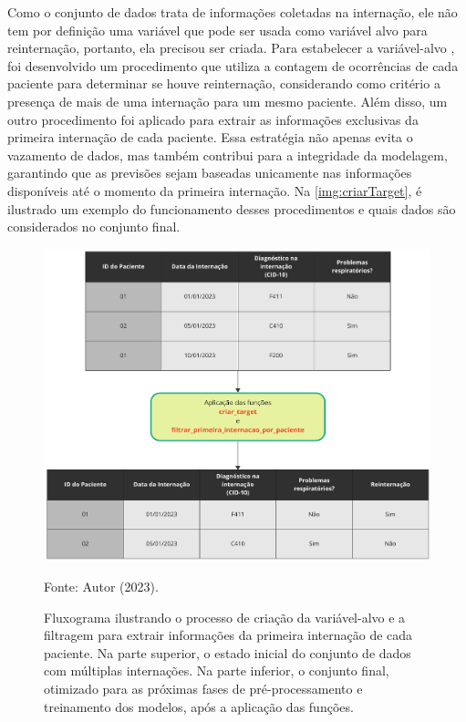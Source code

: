 Como o conjunto de dados trata de informações coletadas na internação, ele não tem por definição uma variável que pode ser usada como variável alvo para reinternação, portanto, ela precisou ser criada. Para estabelecer a variável-alvo , foi desenvolvido um procedimento que utiliza a contagem de ocorrências de cada paciente para determinar se houve reinternação, considerando como critério a presença de mais de uma internação para um mesmo paciente. Além disso, um outro procedimento foi aplicado para extrair as informações exclusivas da primeira internação de cada paciente. Essa estratégia não apenas evita o vazamento de dados, mas também contribui para a integridade da modelagem, garantindo que as previsões sejam baseadas unicamente nas informações disponíveis até o momento da primeira internação. Na \autoref{img:criarTarget}, é ilustrado um exemplo do funcionamento desses procedimentos e quais dados são considerados no conjunto final.

\begin{figure}
	\centering
	\caption{\label{img:criarTarget}Fluxograma ilustrando o processo de criação da variável-alvo  e a filtragem para extrair informações da primeira internação de cada paciente. Na parte superior, o estado inicial do conjunto de dados com múltiplas internações. Na parte inferior, o conjunto final, otimizado para as próximas fases de pré-processamento e treinamento dos modelos, após a aplicação das funções.}
	\includegraphics[scale=0.7]{USPSC-img/criacao_target.pdf}
	\begin{center}
		Fonte: Autor (2023).
	\end{center}
\end{figure}

